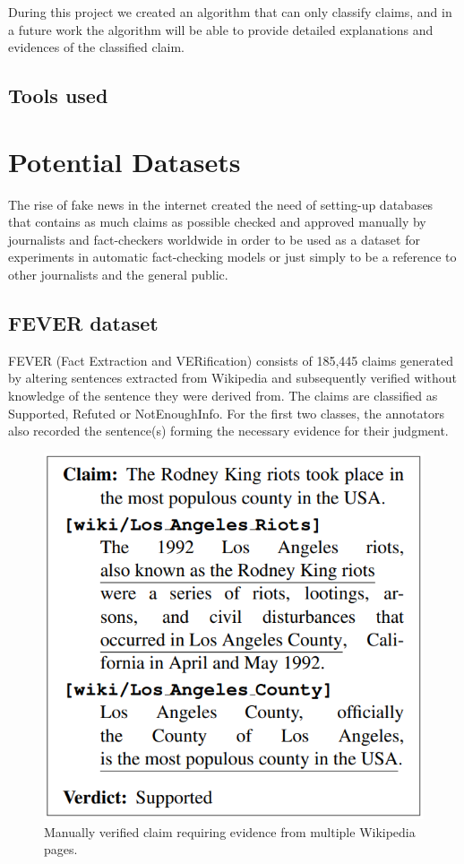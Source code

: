 \documentclass[10pt, english]{report}
\begin{document}
During this project we created an algorithm that can only classify claims, and in a future work the algorithm will be able to provide detailed explanations and evidences of the classified claim.

\section{Tools used}

\chapter{Potential Datasets}
The rise of fake news in the internet created the need of setting-up databases that contains as much claims as possible checked and approved manually by journalists and fact-checkers worldwide in order to be used as a dataset for experiments in automatic fact-checking models or just simply to be a reference to other journalists and the general public.

\section{FEVER dataset \cite{thorne2018fever}}
\label{sec:fever}
FEVER (Fact Extraction and VERification) consists of 185,445 claims generated by altering sentences extracted from Wikipedia and subsequently verified without knowledge of the sentence they were derived from. The claims are classified as Supported, Refuted or NotEnoughInfo. For the first two classes, the annotators also recorded the sentence(s) forming the necessary evidence for their judgment\cite{thorne2018fever}.

\begin{figure}[H]
	\centering
	\includegraphics[scale=0.4]{img/fever_example.png}
	\caption{Manually verified claim requiring evidence from multiple Wikipedia pages.}
\end{figure}
\end{document}
